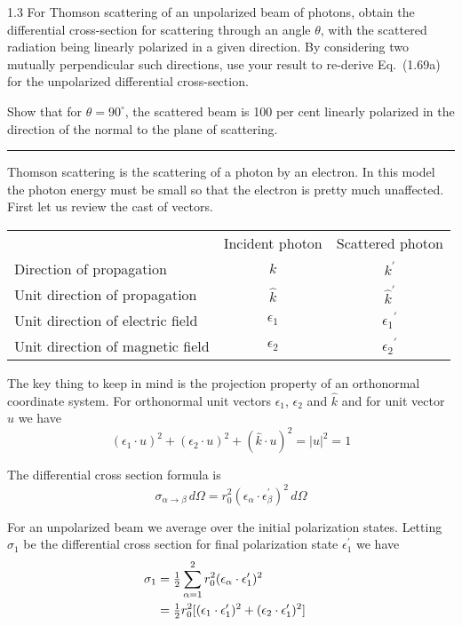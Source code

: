 \documentclass[12pt]{article}
\begin{document}
1.3
For Thomson scattering of an unpolarized beam of photons, obtain the
differential cross-section for scattering through an angle $\theta$,
with the scattered radiation being linearly polarized in a given
direction. By considering two mutually perpendicular such directions,
use your result to re-derive Eq.~(1.69a) for the unpolarized differential
cross-section.

\bigskip
Show that for $\theta=90^\circ$, the scattered beam is
100 per cent linearly polarized in the direction of the normal to the
plane of scattering.

\bigskip
\hrule

\bigskip
Thomson scattering is the scattering of a photon by an electron.
In this model the photon energy must be small so that the electron is
pretty much unaffected.
First let us review the cast of vectors.

\begin{center}
\begin{tabular}{lcc}
& Incident photon & Scattered photon
\\
Direction of propagation & $k$ & $k^\prime$
\\
Unit direction of propagation & $\hat k$ & ${\hat k}^\prime$
\\
Unit direction of electric field & $\epsilon_1$ & ${\epsilon_1}^\prime$
\\
Unit direction of magnetic field & $\epsilon_2$ & ${\epsilon_2}^\prime$
\end{tabular}
\end{center}

The key thing to keep in mind is the projection property of
an orthonormal coordinate system. For orthonormal unit vectors
$\epsilon_1$, $\epsilon_2$ and $\hat k$ and for unit vector $u$
we have
\begin{equation*}
(\epsilon_1\cdot u)^2+(\epsilon_2\cdot u)^2+(\hat k\cdot u)^2=|u|^2=1
\tag{1}
\end{equation*}

The differential cross section formula is
\begin{equation*}
\sigma_{\alpha\rightarrow\beta}\,d\Omega
=r_0^2(\epsilon_\alpha\cdot\epsilon_\beta^\prime)^2\,d\Omega
\end{equation*}

For an unpolarized beam we average over the initial polarization states.
Letting $\sigma_1$ be the differential cross section for final polarization
state $\epsilon_1^\prime$ we have
\begin{align*}
\sigma_1&=\hbox{$1\over2$}\sum_{\alpha=1}^2 r_0^2(\epsilon_\alpha
\cdot\epsilon_1^\prime)^2\cr
&=\hbox{$1\over2$}r_0^2[(\epsilon_1\cdot\epsilon_1^\prime)^2
+(\epsilon_2\cdot\epsilon_1^\prime)^2]\cr
\end{align*}
\end{document}
